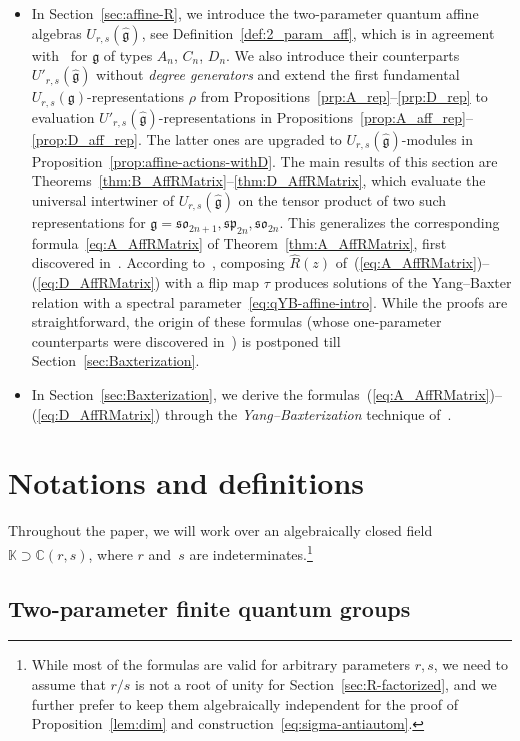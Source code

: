 \documentclass[10pt,a4paper]{amsart}
\numberwithin{equation}{section}
\newcommand{\fg}{\mathfrak{g}}
\newcommand{\sso}{\mathfrak{so}}
\newcommand{\ssp}{\mathfrak{sp}}
\newcommand{\uu}{U_{r,s}(\fg)}
\newcommand{\UU}{U_{r,s}(\widehat{\fg})}
\newcommand{\Uu}{U'_{r,s}(\widehat{\fg})}
\begin{document}
\begin{itemize}
\item[$\bullet$]
In Section~\ref{sec:affine-R}, we introduce the two-parameter quantum affine algebras $\UU$, see Definition~\ref{def:2_param_aff}, which is in agreement with~\cite{HRZ, HZ2,HZ1} for $\fg$ of types $A_n$, $C_n$, $D_n$. We also introduce their counterparts $\Uu$ without \emph{degree generators} and extend the first fundamental $\uu$-representations $\rho$ from Propositions~\ref{prp:A_rep}--\ref{prp:D_rep} to evaluation $\Uu$-representations in Propositions~\ref{prop:A_aff_rep}--\ref{prop:D_aff_rep}. The latter ones are upgraded to $\UU$-modules in Proposition~\ref{prop:affine-actions-withD}. The main results of this section are Theorems~\ref{thm:B_AffRMatrix}--\ref{thm:D_AffRMatrix}, which evaluate the universal intertwiner of $\UU$ on the tensor product of two such representations for $\fg=\sso_{2n+1},\ssp_{2n},\sso_{2n}$. This generalizes the corresponding formula~\eqref{eq:A_AffRMatrix} of Theorem~\ref{thm:A_AffRMatrix}, first discovered in~\cite{JL2}. According to~\cite{Jim}, composing $\hat{R}(z)$ of~(\ref{eq:A_AffRMatrix})--(\ref{eq:D_AffRMatrix}) with a flip map $\tau$ produces solutions of the Yang--Baxter relation with a spectral parameter~\eqref{eq:qYB-affine-intro}. While the proofs are straightforward, the origin of these formulas (whose one-parameter counterparts were discovered in~\cite{Jim}) is postponed till Section~\ref{sec:Baxterization}.

\item[$\bullet$]
In Section~\ref{sec:Baxterization}, we derive the formulas~(\ref{eq:A_AffRMatrix})--(\ref{eq:D_AffRMatrix}) through the \emph{Yang--Baxterization} technique of~\cite{GWX}.
\end{itemize}

\section{Notations and definitions}%

Throughout the paper, we will work over an algebraically closed field $\mathbb{K} \supset \mathbb{C}(r,s)$, where $r$ and~$s$ are indeterminates.\footnote{While most of the formulas
are valid for arbitrary parameters $r,s$, we need to assume that $r/s$ is not a root of unity for Section~\ref{sec:R-factorized}, and we further prefer to keep
them algebraically independent for the proof of Proposition~\ref{lem:dim} and construction~\eqref{eq:sigma-antiautom}.}

\subsection{Two-parameter finite quantum groups}\label{ssec:general-def}
\end{document}
